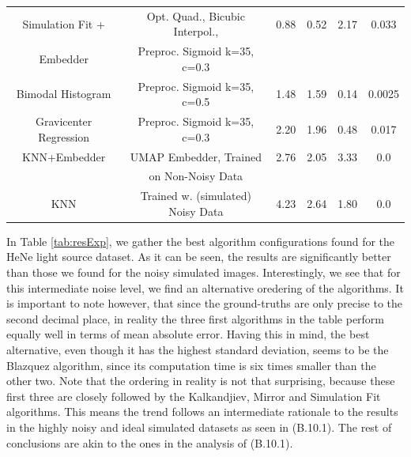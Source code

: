 \documentclass[11pt, a4paper, twoside]{article} %
\begin{document}
\begin{table}[h!]
{\begin{tabular}{c|c|cc|cc}
       Simulation Fit + &    {\small     Opt. Quad., Bicubic Interpol.}, &  0.88 & 0.52 &  2.17 &  0.033 \\
   Embedder                    &      {\small     Preproc. Sigmoid k=35, c=0.3 }&          &         &          &          \\ \hline\rule{0pt}{4mm}{}                     
                       
     Bimodal Histogram &       {\small    Preproc. Sigmoid k=35, c=0.5 }&  1.48 & 1.59 &  0.14 &  0.0025 \\ \hline\rule{0pt}{4mm}{}
Gravicenter Regression &         {\small  Preproc. Sigmoid k=35, c=0.3 } &  2.20 & 1.96 &  0.48 &  0.017 \\ \hline\rule{0pt}{4mm}{}
          KNN+Embedder &                {\small UMAP Embedder, Trained } &  2.76 & 2.05 &  3.33 &  0.0 \\
                       &                      {\small on Non-Noisy Data} &          &         &          &          \\ \hline\rule{0pt}{4mm}{}
                   KNN &    {\small  Trained w. (simulated) Noisy Data }&  4.23 & 2.64 &  1.80 &  0.0 \\
\bottomrule
\end{tabular}
}\vspace{-0.25cm}
\end{table}

In Table \ref{tab:resExp}, we gather the best algorithm configurations found for the HeNe light source dataset. As it can be seen, the results are significantly better than those we found for the noisy simulated images. Interestingly, we see that for this intermediate noise level, we find an alternative oredering of the algorithms. It is important to note however, that since the ground-truths are only precise to the second decimal place, in reality the three first algorithms in the table perform equally well in terms of mean absolute error. Having this in mind, the best alternative, even though it has the highest standard deviation, seems to be the Blazquez algorithm, since its computation time is six times smaller than the other two. Note that the ordering in reality is not that surprising, because these first three are closely followed by the Kalkandjiev, Mirror and Simulation Fit algorithms. This means the trend follows an intermediate rationale to the results in the highly noisy and ideal simulated datasets as seen in (B.10.1). The rest of conclusions are akin to the ones in the analysis of (B.10.1).\vspace{-0.06cm}
\end{document}
